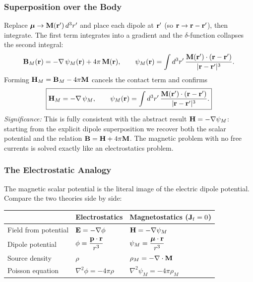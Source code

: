 \subsubsection*{Superposition over the Body}
Replace $\boldsymbol{\mu}\to\mathbf{M}(\mathbf{r}')\,d^3r'$ and place each dipole at $\mathbf{r}'$ (so
$\mathbf{r}\to\mathbf{r}-\mathbf{r}'$), then integrate.  The first term integrates into a gradient and the
$\delta$-function collapses the second integral:
\begin{equation}\label{eq:lec17-BM}
  \mathbf{B}_M(\mathbf{r})
  =-\nabla\,\psi_M(\mathbf{r})+4\pi\,\mathbf{M}(\mathbf{r}),
  \qquad
  \psi_M(\mathbf{r})=\int d^3r'\,
  \frac{\mathbf{M}(\mathbf{r}')\cdot(\mathbf{r}-\mathbf{r}')}{|\mathbf{r}-\mathbf{r}'|^3}.
\end{equation}
Forming $\mathbf{H}_M=\mathbf{B}_M-4\pi\mathbf{M}$ cancels the contact term and confirms
\begin{equation}\label{eq:lec17-HM-grad}
  \boxed{\mathbf{H}_M=-\nabla\,\psi_M,
  \qquad
  \psi_M(\mathbf{r})=\int d^3r'\,\frac{\mathbf{M}(\mathbf{r}')\cdot(\mathbf{r}-\mathbf{r}')}{|\mathbf{r}-\mathbf{r}'|^3}.}
\end{equation}
\textit{Significance:} This is fully consistent with the abstract result
$\mathbf{H}=-\nabla\psi_M$: starting from the explicit dipole superposition we recover both
the scalar potential and the relation $\mathbf{B}=\mathbf{H}+4\pi\mathbf{M}$.  The magnetic problem
with no free currents is solved exactly like an electrostatics problem.

\subsubsection*{The Electrostatic Analogy}
The magnetic scalar potential is the literal image of the electric dipole potential.
Compare the two theories side by side:

\begin{center}
\renewcommand{\arraystretch}{1.4}
\begin{tabular}{lll}
  \toprule
  & \textbf{Electrostatics} & \textbf{Magnetostatics ($\mathbf{J}_{\rm f}=0$)} \\
  \midrule
  Field from potential & $\mathbf{E}=-\nabla\phi$ & $\mathbf{H}=-\nabla\psi_M$ \\
  Dipole potential     & $\phi=\dfrac{\mathbf{p}\cdot\mathbf{r}}{r^3}$
                       & $\psi_M=\dfrac{\boldsymbol{\mu}\cdot\mathbf{r}}{r^3}$ \\
  Source density       & $\rho$ & $\rho_M=-\nabla\cdot\mathbf{M}$ \\
  Poisson equation     & $\nabla^2\phi=-4\pi\rho$ & $\nabla^2\psi_M=-4\pi\rho_M$ \\
  \bottomrule
\end{tabular}
\end{center}

